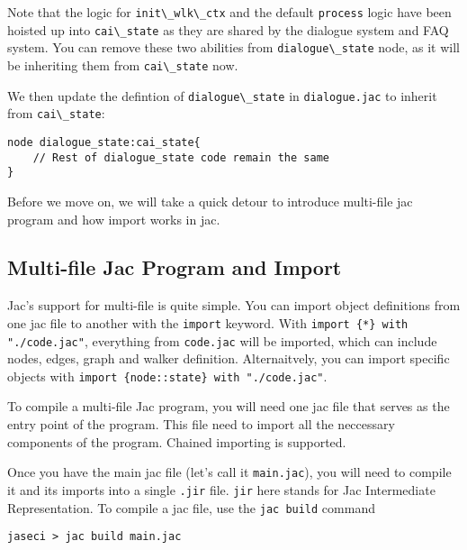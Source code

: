 Note that the logic for \passthrough{\lstinline!init\_wlk\_ctx!} and the
default \passthrough{\lstinline!process!} logic have been hoisted up
into \passthrough{\lstinline!cai\_state!} as they are shared by the
dialogue system and FAQ system. You can remove these two abilities from
\passthrough{\lstinline!dialogue\_state!} node, as it will be inheriting
them from \passthrough{\lstinline!cai\_state!} now.

We then update the defintion of
\passthrough{\lstinline!dialogue\_state!} in
\passthrough{\lstinline!dialogue.jac!} to inherit from
\passthrough{\lstinline!cai\_state!}:

\begin{lstlisting}
node dialogue_state:cai_state{
    // Rest of dialogue_state code remain the same
}
\end{lstlisting}

Before we move on, we will take a quick detour to introduce multi-file
jac program and how import works in jac.

\hypertarget{multi-file-jac-program-and-import}{%
\subsection{Multi-file Jac Program and
Import}\label{multi-file-jac-program-and-import}}

Jac's support for multi-file is quite simple. You can import object
definitions from one jac file to another with the
\passthrough{\lstinline!import!} keyword. With
\passthrough{\lstinline!import \{*\} with "./code.jac"!}, everything
from \passthrough{\lstinline!code.jac!} will be imported, which can
include nodes, edges, graph and walker definition. Alternaitvely, you
can import specific objects with
\passthrough{\lstinline!import \{node::state\} with "./code.jac"!}.

To compile a multi-file Jac program, you will need one jac file that
serves as the entry point of the program. This file need to import all
the neccessary components of the program. Chained importing is
supported.

Once you have the main jac file (let's call it
\passthrough{\lstinline!main.jac!}), you will need to compile it and its
imports into a single \passthrough{\lstinline!.jir!} file.
\passthrough{\lstinline!jir!} here stands for Jac Intermediate
Representation. To compile a jac file, use the
\passthrough{\lstinline!jac build!} command

\begin{lstlisting}
jaseci > jac build main.jac
\end{lstlisting}

